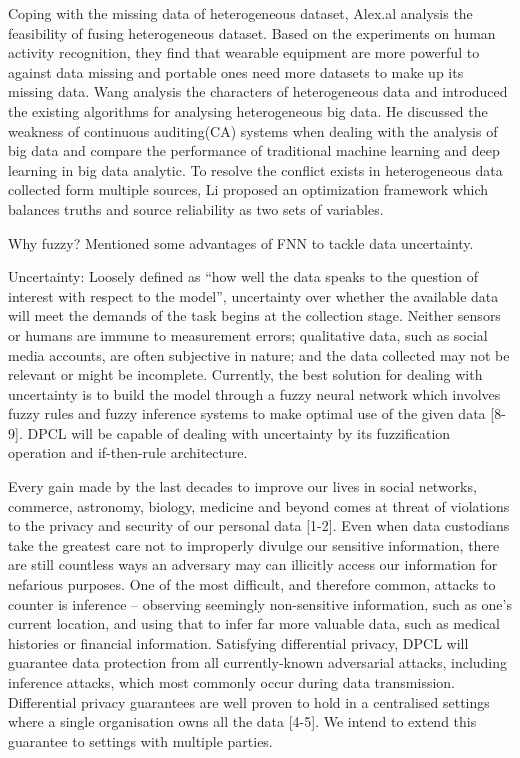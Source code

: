 \documentclass[journal,twocolumn,10pt]{IEEEtran}
\begin{document}
Coping with the missing data of heterogeneous dataset, Alex.al\cite{obinikpo2019big} analysis the feasibility of fusing heterogeneous dataset. Based on the experiments on human activity recognition, they find that wearable equipment are more powerful to against data missing and portable ones need more datasets to make up its missing data. Wang\cite{wang2017heterogeneous} analysis the characters of heterogeneous data and introduced the existing algorithms for analysing heterogeneous big data. He discussed the weakness of continuous auditing(CA) systems when dealing with the analysis of big data and compare the performance of traditional machine learning and deep learning in big data analytic. To resolve the conflict exists in heterogeneous data collected form multiple sources, Li\cite{li2014resolving} proposed an optimization framework which balances truths and source reliability as two sets of variables.

Why fuzzy? Mentioned some advantages of FNN to tackle data uncertainty.

Uncertainty: Loosely defined as “how well the data speaks to the question of interest with respect to the model”, uncertainty over whether the available data will meet the demands of the task begins at the collection stage. Neither sensors or humans are immune to measurement errors; qualitative data, such as social media accounts, are often subjective in nature; and the data collected may not be relevant or might be incomplete. Currently, the best solution for dealing with uncertainty is to build the model through a fuzzy neural network which involves fuzzy rules and fuzzy inference systems to make optimal use of the given data [8-9]. DPCL will be capable of dealing with uncertainty by its fuzzification operation and if-then-rule architecture.

Every gain made by the last decades to improve our lives in social networks, commerce, astronomy, biology, medicine and beyond comes at threat of violations to the privacy and security of our personal data [1-2]. Even when data custodians take the greatest care not to improperly divulge our sensitive information, there are still countless ways an adversary may can illicitly access our information for nefarious purposes. One of the most difficult, and therefore common, attacks to counter is inference – observing seemingly non-sensitive information, such as one’s current location, and using that to infer far more valuable data, such as medical histories or financial information. Satisfying differential privacy, DPCL will guarantee data protection from all currently-known adversarial attacks, including inference attacks, which most commonly occur during data transmission. Differential privacy guarantees are well proven to hold in a centralised settings where a single organisation owns all the data [4-5]. We intend to extend this guarantee to settings with multiple parties.
\end{document}
